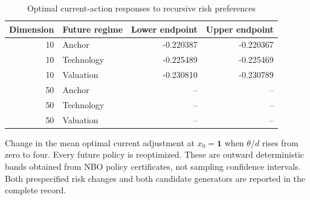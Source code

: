 \begin{table}[htbp]\centering\small
\caption{Optimal current-action responses to recursive risk preferences}\label{tab:r27riskresponses}
\begin{tabular}{rlrr}\toprule
Dimension & Future regime & Lower endpoint & Upper endpoint \\ \midrule
10 & Anchor & -0.220387 & -0.220367 \\
10 & Technology & -0.225489 & -0.225469 \\
10 & Valuation & -0.230810 & -0.230789 \\
50 & Anchor & -- & -- \\
50 & Technology & -- & -- \\
50 & Valuation & -- & -- \\
\bottomrule\end{tabular}
\par\smallskip\parbox{0.97\linewidth}{\footnotesize Change in the mean optimal current adjustment at $x_0=\mathbf 1$ when $\theta/d$ rises from zero to four. Every future policy is reoptimized. These are outward deterministic bands obtained from NBO policy certificates, not sampling confidence intervals. Both prespecified risk changes and both candidate generators are reported in the complete record.}
\end{table}
